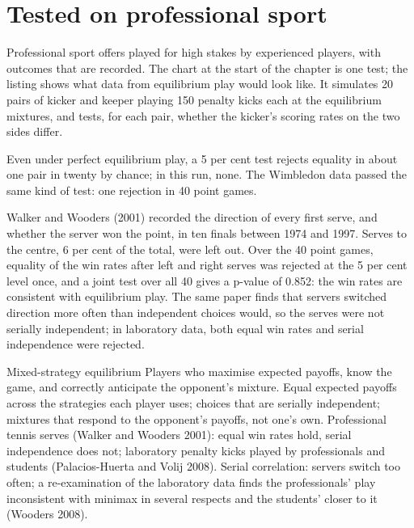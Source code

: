 \section{Tested on professional sport}\label{sec:b2:mixed-strategies:sport}

Professional sport offers  played for high stakes by experienced players, with outcomes
that are recorded. The chart at the start of the chapter is one test; the listing shows what data from
equilibrium play would look like. It simulates 20 pairs of kicker and keeper playing 150 penalty kicks each
at the equilibrium mixtures, and tests, for each pair, whether the kicker's scoring rates on the two sides
differ.

\label{lst:b2:mixed-strategies:penalty}

\label{out:b2:mixed-strategies:penalty}

Even under perfect equilibrium play, a 5 per cent test rejects equality in about one pair in twenty by
chance; in this run, none. The Wimbledon data passed the same kind of test: one rejection in 40 point games.

\begin{record}
Walker and Wooders (2001) recorded the direction of every first serve, and whether the server won the
point, in ten finals between 1974 and 1997. Serves to the centre, 6
per cent of the total, were left out. Over the 40 point games, equality of the win rates after left and right
serves was rejected at the 5 per cent level once, and a joint test over all 40 gives a p-value of 0.852:
the win rates are consistent with equilibrium play. The same paper finds that servers switched direction
more often than independent choices would, so the serves were not serially independent; in laboratory data,
both equal win rates and serial independence were rejected.
\end{record}

\begin{model}{Mixed-strategy equilibrium}
\assumes Players who maximise expected payoffs, know the game, and correctly anticipate the opponent's
mixture.
\predicts Equal expected payoffs across the strategies each player uses; choices that are serially
independent; mixtures that respond to the opponent's payoffs, not one's own.
\tested Professional tennis serves (Walker and Wooders 2001): equal win rates hold, serial independence
does not; laboratory penalty kicks played by professionals and students (Palacios-Huerta and Volij 2008).
\breaks Serial correlation: servers switch too often; a re-examination of the laboratory data finds the
professionals' play inconsistent with minimax in several respects and the students' closer to it (Wooders
2008).
\end{model}

